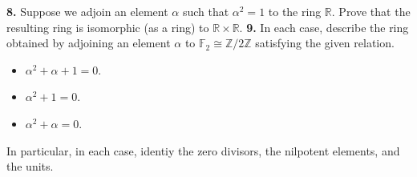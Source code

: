 \documentclass[10pt]{amsart}
\theoremstyle{theorem}
\newcommand{\bF}{\mathbb{F}}
\newcommand{\bZ}{\mathbb{Z}}
\begin{document}
\newpage
\noindent
{\bf 8.}  Suppose we adjoin an element $\alpha$ such that $\alpha^2 = 1$ to the ring $\mathbb{R}$.  Prove that the resulting ring is isomorphic (as a ring) to $\mathbb{R} \times \mathbb{R}$.  
\newpage
\noindent
{\bf 9.}  In each case, describe the ring obtained by adjoining an element $\alpha$ to $\bF_2 \cong \bZ/2\bZ$ satisfying the given relation.
\begin{itemize}
    \item[(a)]  $\alpha^2 + \alpha + 1 = 0$.
    \item[(b)]  $\alpha^2 + 1 = 0$.
    \item[(c)]  $\alpha^2 + \alpha = 0$.
\end{itemize}
In particular, in each case, identiy the zero divisors, the nilpotent elements, and the units.
\end{document}
